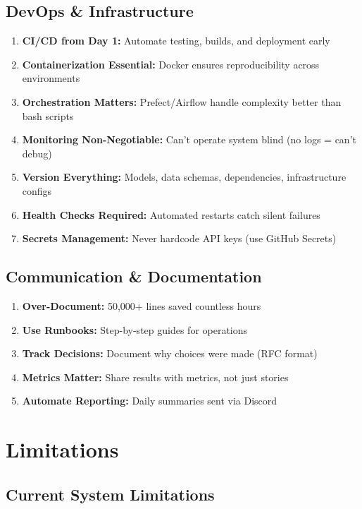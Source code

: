 \subsection{DevOps \& Infrastructure}

\begin{enumerate}
    \item \textbf{CI/CD from Day 1:} Automate testing, builds, and deployment early
    \item \textbf{Containerization Essential:} Docker ensures reproducibility across environments
    \item \textbf{Orchestration Matters:} Prefect/Airflow handle complexity better than bash scripts
    \item \textbf{Monitoring Non-Negotiable:} Can't operate system blind (no logs = can't debug)
    \item \textbf{Version Everything:} Models, data schemas, dependencies, infrastructure configs
    \item \textbf{Health Checks Required:} Automated restarts catch silent failures
    \item \textbf{Secrets Management:} Never hardcode API keys (use GitHub Secrets)
\end{enumerate}

\subsection{Communication \& Documentation}

\begin{enumerate}
    \item \textbf{Over-Document:} 50,000+ lines saved countless hours
    \item \textbf{Use Runbooks:} Step-by-step guides for operations
    \item \textbf{Track Decisions:} Document why choices were made (RFC format)
    \item \textbf{Metrics Matter:} Share results with metrics, not just stories
    \item \textbf{Automate Reporting:} Daily summaries sent via Discord
\end{enumerate}

\section{Limitations}

\subsection{Current System Limitations}

